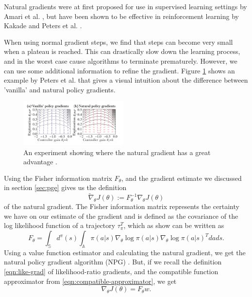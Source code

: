\documentclass[final]{IEEEtran}
\begin{document}
Natural gradients were at first proposed for use in supervised learning settings by Amari et al. \cite{Amari:1998:NGW:287476.287477}, but have been shown to be effective in reinforcement learning by Kakade \cite{Kakade:2001} and Peters et al. \cite{4863}.

When using normal gradient steps, we find that steps can become very small when a plateau is reached. 
This can drastically slow down the learning process, and in the worst case cause algorithms to terminate prematurely. 
However, we can use some additional information to refine the gradient. 
Figure \ref{fig:nat-grad-adv} shows an example by Peters et al. \cite{Peters_IICHR_2003} that gives a visual intuition about the difference between 'vanilla' and natural policy gradients. 

\begin{figure}
  \includegraphics[width=0.485\textwidth]{nat-grad-adv}
  \caption{An experiment showing where the natural gradient has a great advantage \cite{Peters_IICHR_2003}. }\label{fig:nat-grad-adv}
\end{figure}

Using the Fisher information matrix $F_\theta$, and the gradient estimate we discussed in section \ref{sec:pge} gives us the definition
\begin{equation}
  \widetilde{\nabla}_\theta J(\theta) := F^{-1}_\theta \nabla_\theta J(\theta)
  \label{eqn:nat-grad}
\end{equation}
of the natural gradient. 
The Fisher information matrix represents the certainty we have on our estimate of the gradient and is defined as the covariance of the log likelihood function of a trajectory $\tau_{\pi}^T$, which as \cite{4863} show can be written as 
\begin{equation}
  F_\theta = \int_\mathbb{S} d^\pi(s) \int_\mathbb{A} \pi(a|s) \nabla_\theta \log{\pi(a|s)} \nabla_\theta \log{\pi(a|s)}^T dads.
  \label{eqn:F}
\end{equation}
Using a value function estimator and calculating the natural gradient, we get the natural policy gradient algorithm (NPG) \cite{NIPS2017_7233}.
But, if we recall the definition \eqref{eqn:like-grad} of likelihood-ratio gradients, and the compatible function approximator from \eqref{eqn:compatible-approximator}, we get
\begin{equation}
  \nabla_\theta J(\theta) = F_\theta w.
  \label{eqn:J-equals-F}
\end{equation}
\end{document}
